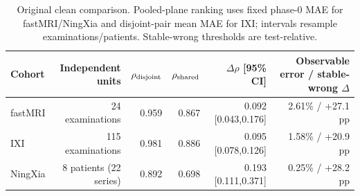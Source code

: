 \begin{table}[t]\centering
\caption{Original clean comparison. Pooled-plane ranking uses fixed phase-0 MAE for fastMRI/NingXia and disjoint-pair mean MAE for IXI; intervals resample examinations/patients. Stable-wrong thresholds are test-relative.}
\label{tab:controlled}\setlength{\tabcolsep}{4pt}
\begin{tabular}{lrrrrr}\toprule
Cohort & Independent units & $\rho_{\rm disjoint}$ & $\rho_{\rm shared}$ & $\Delta\rho$ [95\% CI] & Observable error / stable-wrong $\Delta$\\\midrule
fastMRI & 24 examinations & 0.959 & 0.867 & 0.092 [0.043,0.176] & 2.61\% / +27.1 pp \\
IXI & 115 examinations & 0.981 & 0.886 & 0.095 [0.078,0.126] & 1.58\% / +20.9 pp \\
NingXia & 8 patients (22 series) & 0.892 & 0.698 & 0.193 [0.111,0.371] & 0.25\% / +28.2 pp \\\bottomrule\end{tabular}\end{table}
